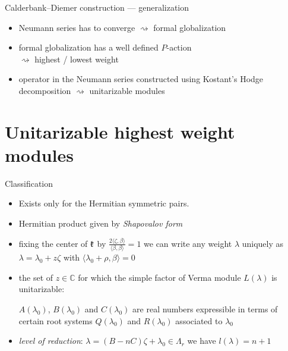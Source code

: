 \documentclass[10pt]{beamer}
\begin{document}
\begin{frame}{Calderbank--Diemer construction --- generalization}
\begin{itemize}[<+- | alert@+>]
	\item Neumann series has to converge $\rightsquigarrow$ formal globalization
	\item formal globalization has a well defined $P$-action\\ \hspace{1cm} $\rightsquigarrow$ highest / lowest weight
	\item operator in the Neumann series constructed using Kostant's Hodge decomposition $\rightsquigarrow$ unitarizable modules
\end{itemize}

\end{frame}


\section{Unitarizable highest weight modules}


\begin{frame}{Classification}
\begin{itemize}[<+- | alert@+>]
	\item Exists only for the Hermitian symmetric pairs. 
	\item Hermitian product given by \emph{Shapovalov form}
	\item fixing the center of $\mathfrak{k}$ by  $\frac{2 \langle \zeta,\beta \rangle}{\langle \beta, \beta \rangle} = 1$ we can write any weight $\lambda$ uniquely as $\lambda = \lambda_0 + z \zeta$ with  $\langle \lambda_0 + \rho,\beta \rangle = 0$
	\item the set of $z \in \mathbb{C}$ for which the simple factor of Verma module $L(\lambda)$ is unitarizable:
	
	
	$A(\lambda_0)$, $B(\lambda_0)$ and $C(\lambda_0)$ are real numbers expressible in terms of certain root systems $Q(\lambda_0)$ and $R(\lambda_0)$ associated to $\lambda_0$
	\item \emph{level of reduction}: $\lambda=(B - nC)\zeta + \lambda_0 \in \Lambda_r$ we have $l(\lambda) =n+1$
\end{itemize}
\end{frame}
\end{document}
